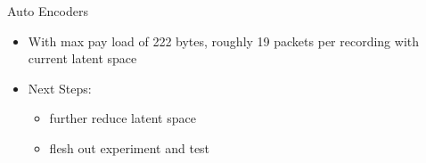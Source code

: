 \begin{frame}{Auto Encoders}
    \begin{itemize}
        \item With max pay load of 222 bytes, roughly 19 packets per recording with current latent space
        \item Next Steps:
        \begin{itemize}
            \item further reduce latent space 
            \item flesh out experiment and test
        \end{itemize}
    \end{itemize}
\end{frame}




